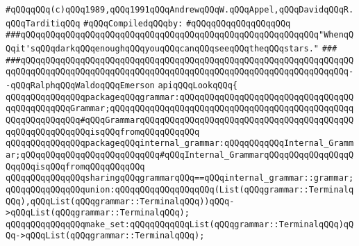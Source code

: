 \label{src/app/yacc/src/look.api}
\verb|#qQQqqQQq(c)qQQq1989,qQQq1991qQQqAndrewqQQqW.qQQqAppel,qQQqDavidqQQqR.qQQqTarditiqQQq|\newline
\newline
\verb|#qQQqCompiledqQQqby:|\newline
\verb|#qQQqqQQqqQQqqQQqqQQq|\newline
\newline
\newline
\newline
\verb|###qQQqqQQqqQQqqQQqqQQqqQQqqQQqqQQqqQQqqQQqqQQqqQQqqQQqqQQqqQQq"WhenqQQqit'sqQQqdarkqQQqenoughqQQqyouqQQqcanqQQqseeqQQqtheqQQqstars."|\newline
\verb|###|\newline
\verb|###qQQqqQQqqQQqqQQqqQQqqQQqqQQqqQQqqQQqqQQqqQQqqQQqqQQqqQQqqQQqqQQqqQQqqQQqqQQqqQQqqQQqqQQqqQQqqQQqqQQqqQQqqQQqqQQqqQQqqQQqqQQqqQQqqQQqqQQq--qQQqRalphqQQqWaldoqQQqEmerson|\newline
\newline
\newline
\newline
\verb|apiqQQqLookqQQq{|\newline
\newline
\verb|qQQqqQQqqQQqqQQqpackageqQQqgrammar:qQQqqQQqqQQqqQQqqQQqqQQqqQQqqQQqqQQqqQQqqQQqqQQqGrammar;qQQqqQQqqQQqqQQqqQQqqQQqqQQqqQQqqQQqqQQqqQQqqQQqqQQqqQQqqQQqqQQq#qQQqGrammarqQQqqQQqqQQqqQQqqQQqqQQqqQQqqQQqqQQqqQQqqQQqqQQqqQQqqQQqqQQqisqQQqfromqQQqqQQqqQQq|\newline
\verb|qQQqqQQqqQQqqQQqpackageqQQqinternal_grammar:qQQqqQQqqQQqInternal_Grammar;qQQqqQQqqQQqqQQqqQQqqQQqqQQq#qQQqInternal_GrammarqQQqqQQqqQQqqQQqqQQqqQQqisqQQqfromqQQqqQQqqQQq|\newline
\newline
\verb|qQQqqQQqqQQqqQQqsharingqQQqgrammarqQQq==qQQqinternal_grammar::grammar;|\newline
\newline
\verb|qQQqqQQqqQQqqQQqunion:qQQqqQQqqQQqqQQqqQQq(List(qQQqgrammar::TerminalqQQq),qQQqList(qQQqgrammar::TerminalqQQq))qQQq->qQQqList(qQQqgrammar::TerminalqQQq);|\newline
\verb|qQQqqQQqqQQqqQQqmake_set:qQQqqQQqqQQqList(qQQqgrammar::TerminalqQQq)qQQq->qQQqList(qQQqgrammar::TerminalqQQq);|\newline
